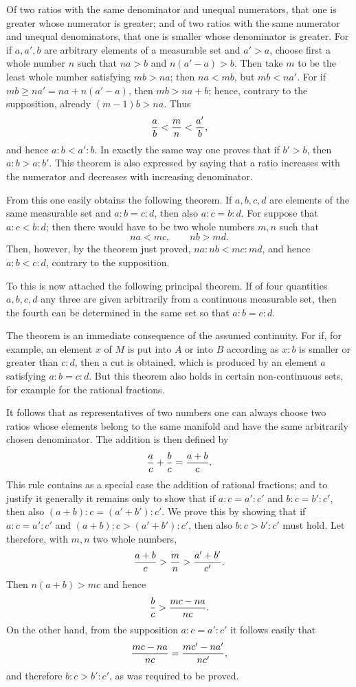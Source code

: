 \documentclass[11pt]{article}
\begin{document}
Of two ratios with the same denominator and unequal numerators, that one is greater whose numerator is greater; and of two ratios with the same numerator and unequal denominators, that one is smaller whose denominator is greater. For if $a,a',b$ are arbitrary elements of a measurable set and $a'>a$, choose first a whole number $n$ such that $na>b$ and $n(a'-a)>b$. Then take $m$ to be the least whole number satisfying $mb>na$; then $na<mb$, but $mb<na'$. For if $mb\ge na'=na+n(a'-a)$, then $mb>na+b$; hence, contrary to the supposition, already $(m-1)b>na$. Thus
\[
 {a\over b}<{m\over n}<{a'
\over b},
\]
and hence $a:b<a':b$. In exactly the same way one proves that if $b'>b$, then $a:b>a:b'$. This theorem is also expressed by saying that a ratio increases with the numerator and decreases with increasing denominator.

From this one easily obtains the following theorem. If $a,b,c,d$ are elements of the same measurable set and $a:b=c:d$, then also $a:c=b:d$. For suppose that $a:c<b:d$; then there would have to be two whole numbers $m,n$ such that
\[
 na<mc,
 \qquad nb>md.
\]
Then, however, by the theorem just proved, $na:nb<mc:md$, and hence $a:b<c:d$, contrary to the supposition.

To this is now attached the following principal theorem. If of four quantities $a,b,c,d$ any three are given arbitrarily from a continuous measurable set, then the fourth can be determined in the same set so that $a:b=c:d$.

The theorem is an immediate consequence of the assumed continuity. For if, for example, an element $x$ of $M$ is put into $A$ or into $B$ according as $x:b$ is smaller or greater than $c:d$, then a cut is obtained, which is produced by an element $a$ satisfying $a:b=c:d$. But this theorem also holds in certain non-continuous sets, for example for the rational fractions.

It follows that as representatives of two numbers one can always choose two ratios whose elements belong to the same manifold and have the same arbitrarily chosen denominator. The addition is then defined by
\[
 {a\over c}+{b\over c}={a+b\over c}.
\]
This rule contains as a special case the addition of rational fractions; and to justify it generally it remains only to show that if $a:c=a':c'$ and $b:c=b':c'$, then also $(a+b):c=(a'+b'):c'$. We prove this by showing that if $a:c=a':c'$ and $(a+b):c>(a'+b'):c'$, then also $b:c>b':c'$ must hold. Let therefore, with $m,n$ two whole numbers,
\[
 {a+b\over c}>{m\over n}>{a'+b'
\over c'}.
\]
Then $n(a+b)>mc$ and hence
\[
 {b\over c}>{mc-na\over nc}.
\]
On the other hand, from the supposition $a:c=a':c'$ it follows easily that
\[
 {mc-na\over nc}={mc'-na'\over nc'},
\]
and therefore $b:c>b':c'$, as was required to be proved.
\end{document}
